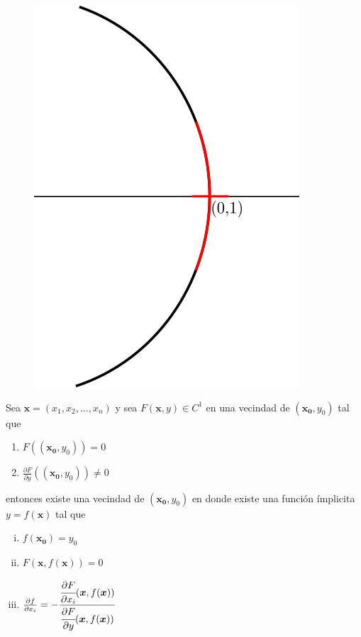 \documentclass[spanish]{beamer}
\begin{document}
\begin{frame}
    \begin{figure}[ht]
      \begin{center}
      \includegraphics[width=0.5\linewidth]{../gfx/unit-circle3}
      \end{center}
    \end{figure}
\end{frame}

\begin{frame}
    \begin{theorem}
        Sea $\bm{x} = (x_{1},x_{2},\ldots,x_{n})$ y sea $F(\bm{x},y) \in C^{1}$ 
        en una vecindad de $(\bm{x_{0}},y_{0})$ tal que
        \begin{enumerate}
            \item $F((\bm{x_{0}},y_{0})) = 0$
            \item $\frac{\partial F}{\partial y}((\bm{x_{0}},y_{0})) \ne 0$
        \end{enumerate}
        entonces existe una vecindad de $(\bm{x_{0}},y_{0})$ en donde existe una
        funci\'on \'implicita $y=f(\bm{x})$ tal que
        \begin{enumerate}[i.]
            \item $f(\bm{x_{0}}) = y_{0}$
            \item $F(\bm{x}, f(\bm{x})) = 0$
            \item $\frac{\partial f}{\partial x_{i}} = -\cfrac{\cfrac{\partial F}{\partial x_{i}}(\bm{x},f(\bm{x}))}{\cfrac{\partial F}{\partial y}(\bm{x},f(\bm{x}))}$
        \end{enumerate}
    \end{theorem}
\end{frame}
\end{document}

